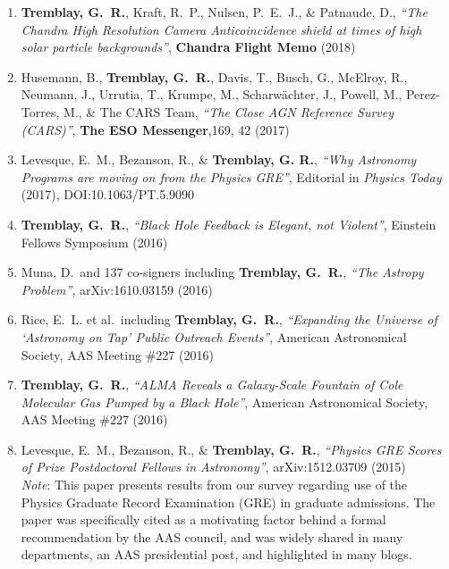 \documentclass[11pt]{article}
\begin{document}
\begin{enumerate}

\item \textbf{Tremblay, G.~R.}, Kraft, R.~P., Nulsen, P.~E.~J.,
\& Patnaude, D., \textit{``The Chandra High Resolution Camera Anticoincidence shield at times of high solar particle backgrounds''}, \textbf{Chandra Flight Memo} (2018)

\item Husemann, B., \textbf{Tremblay, G.~R.}, Davis, T., Busch, G., McElroy, R., Neumann, J., Urrutia, T.,
Krumpe, M., Scharw\"{a}chter, J., Powell, M., Perez-Torres, M., \& The CARS Team, \textit{``The Close AGN Reference Survey (CARS)''}, \textbf{The ESO Messenger},169, 42 (2017)

\item Levesque, E.~M., Bezanson, R., \& \textbf{Tremblay, G. R.},
\textit{``Why Astronomy Programs are moving on from the Physics GRE''}, Editorial in \textit{Physics Today} (2017), DOI:10.1063/PT.5.9090

\item \textbf{Tremblay, G.~R.}, \textit{``Black Hole Feedback is Elegant, not Violent''}, Einstein Fellows Symposium (2016)

\item Muna, D.~and 137 co-signers including \textbf{Tremblay, G.~R.},
\textit{``The Astropy Problem''}, arXiv:1610.03159 (2016)


\item Rice, E.~L. et al.~including \textbf{Tremblay, G.~R.}, \textit{``Expanding the Universe of `Astronomy on Tap' Public Outreach Events''}, American Astronomical Society, AAS Meeting \#227 (2016)


\item \textbf{Tremblay, G.~R.}, \textit{``ALMA Reveals a Galaxy-Scale Fountain of Cole Molecular Gas Pumped by a Black Hole''}, American Astronomical Society, AAS Meeting \#227 (2016)

\item Levesque, E.~M., Bezanson, R., \&  \textbf{Tremblay, G.~R.}, \textit{``Physics GRE Scores of Prize Postdoctoral Fellows in Astronomy''}, arXiv:1512.03709 (2015) \\
\textit{Note}: This paper presents results from our survey regarding
use of the Physics Graduate Record Examination (GRE) in graduate admissions. The paper was specifically cited as a motivating factor behind a formal recommendation by the AAS council, and was widely shared in many departments, an AAS presidential post, and highlighted in many blogs.



\end{enumerate}
\end{document}
